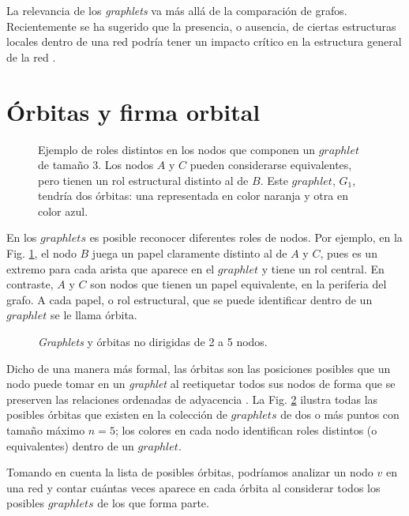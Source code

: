 La relevancia de los \textit{graphlets} va más allá de la comparación de grafos. Recientemente se ha sugerido que la presencia, o ausencia, de ciertas estructuras locales dentro de una red podría tener un impacto crítico en la estructura general de la red \cite{lusher_exponential_nodate}.




\section{Órbitas y firma orbital}
\begin{figure}[htbp]
   \centering
   
    \caption{Ejemplo de roles distintos en los nodos que componen un $graphlet$ de tamaño 3. Los nodos $A$ y $C$ pueden considerarse equivalentes, pero tienen un rol estructural distinto al de $B$. Este $graphlet$, $G_1$, tendría dos órbitas: una representada en color naranja y otra en color azul.}
    \label{fig:ejemploOrbita}
\end{figure}

 
En los $graphlets$ es posible reconocer diferentes roles de nodos. Por ejemplo, en la Fig. \ref{fig:ejemploOrbita}, el nodo $B$ juega un papel claramente distinto al de $A$ y $C$, pues es un extremo para cada arista que aparece en el $graphlet$ y tiene un rol central. En contraste, $A$ y $C$ son nodos que tienen un papel equivalente, en la periferia del grafo. A cada papel, o rol estructural, que se puede identificar dentro de un $graphlet$ se le llama órbita.


\begin{figure}[htbp]
   \centering
   
    \caption{\textit{Graphlets} y órbitas no dirigidas de 2 a 5 nodos.}
    \label{fig:graphletsfig}
\end{figure}

Dicho de una manera más formal, las órbitas son las posiciones posibles que un nodo puede tomar en un \textit{graphlet} al reetiquetar todos sus nodos de forma que se preserven las relaciones ordenadas de adyacencia  \cite{sarajlic_graphlet-based_2016}. La Fig. \ref{fig:graphletsfig} ilustra todas las posibles órbitas que existen en la colección de $graphlets$ de dos o más puntos con tamaño máximo $n=5$; los colores en cada nodo identifican roles distintos (o equivalentes) dentro de un $graphlet$. 

Tomando en cuenta la lista de posibles órbitas, podríamos analizar un nodo $v$ en una red y contar cuántas veces aparece en cada órbita al considerar todos los posibles $graphlets$ de los que forma parte. 

